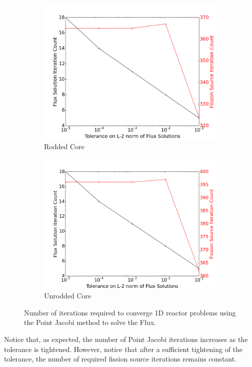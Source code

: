 \documentclass[12pt]{report}
\begin{document}
			\begin{figure}[ht]
				\centering
				\begin{subfigure}{.5\textwidth}
					\centering
					\includegraphics[width=.9\linewidth]{rod_PJ.png}
					\caption{Rodded Core}
					\label{fig::rod_pj}
				\end{subfigure}%
				\begin{subfigure}{.5\textwidth}
					\centering
					\includegraphics[width=.9\linewidth]{urod_PJ.png}
					\caption{Unrodded Core}
					\label{fig::urod_pj}
				\end{subfigure}
				\caption{Number of iterations required to converge 1D reactor problems using the Point Jacobi method to solve the Flux.}
				\label{fig::PJ_convergence}
			\end{figure}	
			
	Notice that, as expected, the number of Point Jacobi iterations increases as the tolerance is tightened. However, notice that after a sufficient tightening of the tolerance, the number of required fission source iterations remains constant. 
	
\end{document}
